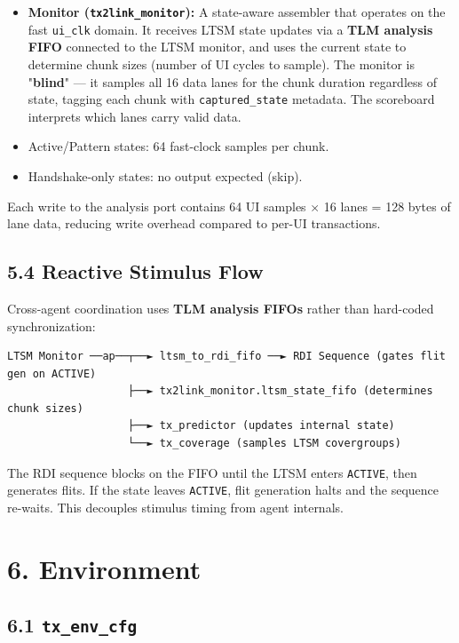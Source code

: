 \documentclass[11pt,a4paper]{article}
\begin{document}
\begin{itemize}
  \item \textbf{Monitor (\texttt{tx2link\_monitor}):} A state-aware assembler that operates on the fast \texttt{ui\_clk} domain. It receives LTSM state updates via a \textbf{TLM analysis FIFO} connected to the LTSM monitor, and uses the current state to determine chunk sizes (number of UI cycles to sample). The monitor is "\textbf{blind}" --- it samples all 16 data lanes for the chunk duration regardless of state, tagging each chunk with \texttt{captured\_state} metadata. The scoreboard interprets which lanes carry valid data.

  \item Active/Pattern states: 64 fast-clock samples per chunk.
  \item Handshake-only states: no output expected (skip).
\end{itemize}


  Each write to the analysis port contains 64 UI samples $\times$ 16 lanes = 128 bytes of lane data, reducing write overhead compared to per-UI transactions.

\subsection{5.4 Reactive Stimulus Flow}

Cross-agent coordination uses \textbf{TLM analysis FIFOs} rather than hard-coded synchronization:

\begin{lstlisting}
LTSM Monitor ──ap──┬──► ltsm_to_rdi_fifo ──► RDI Sequence (gates flit gen on ACTIVE)
                   ├──► tx2link_monitor.ltsm_state_fifo (determines chunk sizes)
                   ├──► tx_predictor (updates internal state)
                   └──► tx_coverage (samples LTSM covergroups)
\end{lstlisting}


The RDI sequence blocks on the FIFO until the LTSM enters \texttt{ACTIVE}, then generates flits. If the state leaves \texttt{ACTIVE}, flit generation halts and the sequence re-waits. This decouples stimulus timing from agent internals.


\section{6. Environment}

\subsection{6.1 \texttt{tx\_env\_cfg}}
\end{document}
